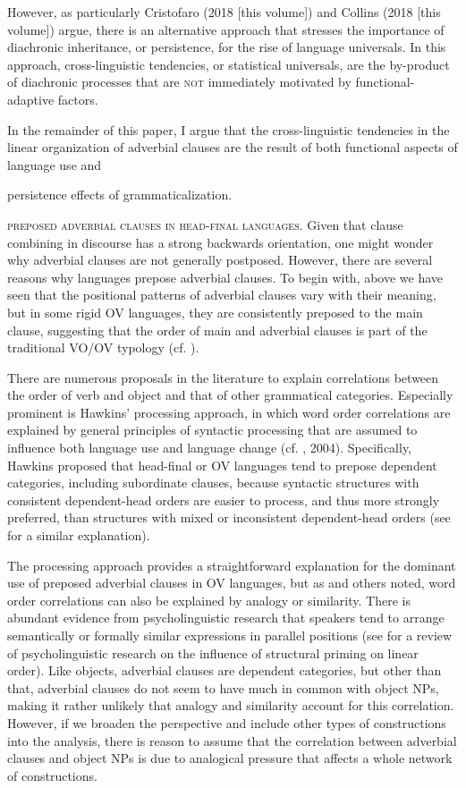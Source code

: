 \documentclass[output=paper]{langsci/langscibook}
\begin{document}
However, as particularly Cristofaro (2018 [this volume]) and Collins (2018 [this volume]) argue, there is an alternative approach that stresses the importance of diachronic inheritance, or persistence, for the rise of language universals. In this approach, cross-linguistic tendencies, or statistical universals, are the by-product of diachronic processes that are \textsc{not} immediately motivated by functional-adaptive factors. 

In the remainder of this paper, I argue that the cross-linguistic tendencies in the linear organization of adverbial clauses are the result of both functional aspects of language use and 

persistence effects of grammaticalization. 

\textsc{preposed} \textsc{adverbial} \textsc{clauses} \textsc{in} \textsc{head-final} \textsc{languages}. Given that clause combining in discourse has a strong backwards orientation, one might wonder why adverbial clauses are not generally postposed. However, there are several reasons why languages prepose adverbial clauses. To begin with, above we have seen that the positional patterns of adverbial clauses vary with their meaning, but in some rigid OV languages, they are consistently preposed to the main clause, suggesting that the order of main and adverbial clauses is part of the traditional VO/OV typology (cf. \citealt{Diessel2001}).

There are numerous proposals in the literature to explain correlations between the order of verb and object and that of other grammatical categories. Especially prominent is Hawkins’ processing approach, in which word order correlations are explained by general principles of syntactic processing that are assumed to influence both language use and language change (cf. \citealt{Hawkins1994}, 2004). Specifically, Hawkins proposed that head-final or OV languages tend to prepose dependent categories, including subordinate clauses, because syntactic structures with consistent dependent-head orders are easier to process, and thus more strongly preferred, than structures with mixed or inconsistent dependent-head orders (see \citealt{Dryer1992} for a similar explanation).

The processing approach provides a straightforward explanation for the dominant use of preposed adverbial clauses in OV languages, but as \citet{Krifka1985} and others noted, word order correlations can also be explained by analogy or similarity. There is abundant evidence from psycholinguistic research that speakers tend to arrange semantically or formally similar expressions in parallel positions (see \citealt{PickeringFerreira2008} for a review of psycholinguistic research on the influence of structural priming on linear order). Like objects, adverbial clauses are dependent categories, but other than that, adverbial clauses do not seem to have much in common with object NPs, making it rather unlikely that analogy and similarity account for this correlation. However, if we broaden the perspective and include other types of constructions into the analysis, there is reason to assume that the correlation between adverbial clauses and object NPs is due to analogical pressure that affects a whole network of constructions.
\end{document}
